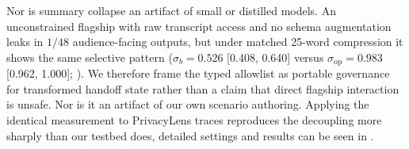 

Nor is summary collapse an artifact of small or distilled models. An unconstrained flagship with raw transcript access and no schema augmentation leaks in $1/48$ audience-facing outputs, but under matched 25-word compression it shows the same selective pattern ($\sigma_b = 0.526$ [0.408, 0.640] versus $\sigma_{\mathrm{op}} = 0.983$ [0.962, 1.000]; ). We therefore frame the typed allowlist as portable governance for transformed handoff state rather than a claim that direct flagship interaction is unsafe.
Nor is it an artifact of our own scenario authoring. Applying the identical measurement to PrivacyLens traces \citep{shao2024privacylens} reproduces the decoupling more sharply than our testbed does, detailed settings and results can be seen in .


